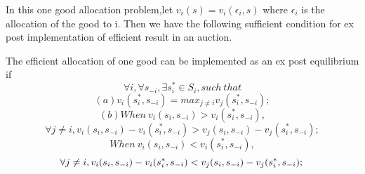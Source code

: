 In this one good allocation problem,let $v_i(s)=v_i(\epsilon_i,s)$ where $\epsilon_i$ is the allocation of the good to i. Then we
have the following sufficient condition for ex post implementation of efficient result in an auction.
\begin{prop}
The efficient allocation of one good can be implemented  as an ex post equilibrium
if  
 $$\forall i,\forall s_{-i}, \exists s_i^* \in S_i, such\ that $$
 $$(a) v_i(s_i^*, s_{-i}) = max_{j\not = i} v_j(s_i^*, s_{-i}); $$
 $$(b) When\ v_i(s_i, s_{-i}) > v_i(s_i^*, s_{-i}), $$
  $$\forall j \not = i, v_i(s_i, s_{-i}) - v_i(s_i^*, s_{-i}) > v_j(s_i, s_{-i}) - v_j(s_i^*, s_{-i});$$
  $$When\ v_i(s_i, s_{-i}) < v_i(s_i^*, s_{-i}), $$
  $$\forall j \not = i, v_i(s_i, s_{-i}) - v_i(s_i^*, s_{-i}) < v_j(s_i, s_{-i}) - v_j(s_i^*, s_{-i});\\
  $$
 
\end{prop}
